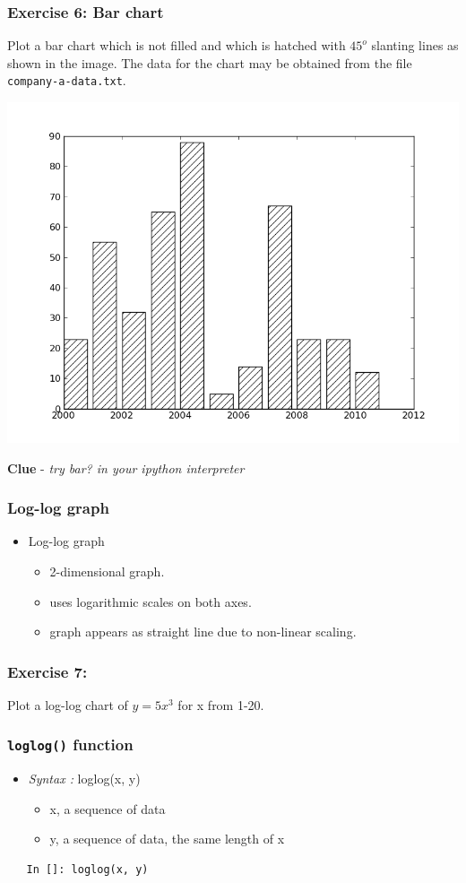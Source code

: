 \documentclass[presentation]{beamer}
\begin{document}
\begin{frame}
\frametitle{Exercise 6: Bar chart}
\label{sec-15}

  Plot a bar chart which is not filled and which is hatched with 
    $45^o$
  slanting lines as shown in the image. The data for the chart may be
  obtained from the file \verb~company-a-data.txt~.
   \begin{center}
      \includegraphics[scale=0.3]{bar-chart-hatch}    
    \end{center}
  \textbf{Clue} - \emph{try bar? in your ipython interpreter}
\end{frame}
\begin{frame}
\frametitle{Log-log graph}
\label{sec-16}


\begin{itemize}
\item Log-log graph
\begin{itemize}
\item 2-dimensional graph.
\item uses logarithmic scales on both axes.
\item graph appears as straight line due to non-linear scaling.
\end{itemize}
\end{itemize}
\end{frame}
\begin{frame}
\frametitle{Exercise 7:}
\label{sec-17}

  Plot a log-log chart of 
    $y = 5x^3$
  for x from 1-20.
\end{frame}
\begin{frame}[fragile]
\frametitle{\verb~loglog()~ function}
\label{sec-18}


\begin{itemize}
\item \emph{Syntax :} loglog(x, y)
\begin{itemize}
\item x, a sequence of data
\item y, a sequence of data, the same length of x
\end{itemize}
\end{itemize}
\begin{verbatim}
   In []: loglog(x, y)
\end{verbatim}
\end{frame}
\end{document}
